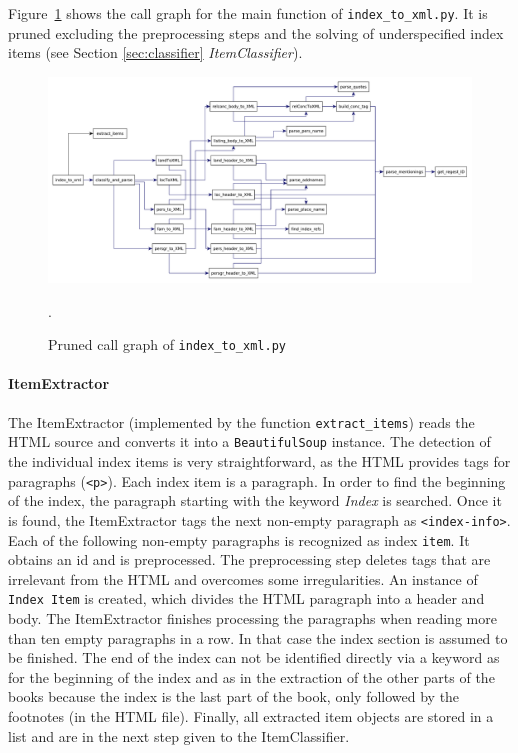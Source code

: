 Figure~\ref{fig:index-to-xml} shows the call graph for the main
function of \texttt{index\_to\_xml.py}. It is pruned excluding the
preprocessing steps and the solving of underspecified index items (see
Section \ref{sec:classifier} \textit{ItemClassifier}).

\begin{figure}[h]
  \centering
  \includegraphics[scale=0.37]{img/index-to-xml}
  \caption{Pruned call graph of \texttt{index\_to\_xml.py}}.
  \label{fig:index-to-xml}
\end{figure}

\paragraph{ItemExtractor}
The ItemExtractor (implemented by the function
\texttt{extract\_items}) reads the HTML source and converts it into a
\texttt{BeautifulSoup} instance. The detection of the individual index
items is very straightforward, as the HTML provides tags for
paragraphs (\texttt{<p>}). Each index item is a paragraph. In order to
find the beginning of the index, the paragraph starting with the
keyword \textit{Index} is searched. Once it is found, the
ItemExtractor tags the next non-empty paragraph as
\texttt{<index-info>}. Each of the following non-empty paragraphs is
recognized as index \texttt{item}. It obtains an id and is
preprocessed. The preprocessing step deletes tags that are irrelevant
from the HTML and overcomes some irregularities. An instance of
\texttt{Index Item} is created, which divides the HTML paragraph into
a header and body. The ItemExtractor finishes processing the
paragraphs when reading more than ten empty paragraphs in a row. In
that case the index section is assumed to be finished. The end of the
index can not be identified directly via a keyword as for the
beginning of the index and as in the extraction of the other parts of
the books because the index is the last part of the book, only
followed by the footnotes (in the HTML file). Finally, all extracted
item objects are stored in a list and are in the next step given to
the ItemClassifier.

